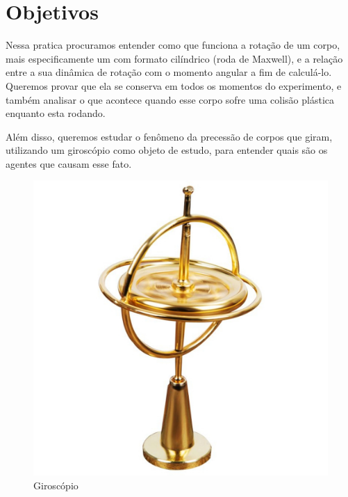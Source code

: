 \newpage
\section{Objetivos}

Nessa pratica procuramos entender como que funciona a rotação de um corpo, mais especificamente um com formato cilíndrico (roda de Maxwell), e a relação entre a sua dinâmica de rotação com o momento angular a fim de calculá-lo. Queremos provar que ela se conserva em todos os momentos do experimento, e também analisar o que acontece quando esse corpo sofre uma colisão plástica enquanto esta rodando.

Além disso, queremos estudar o fenômeno da precessão de corpos que giram, utilizando um giroscópio como objeto de estudo, para entender quais são os agentes que causam esse fato.

\begin{figure}[H]
  \centering
  \includegraphics[scale=0.2]{images/giroscopio-brinquedo.jpg}
  \caption{Giroscópio}
\end{figure}
